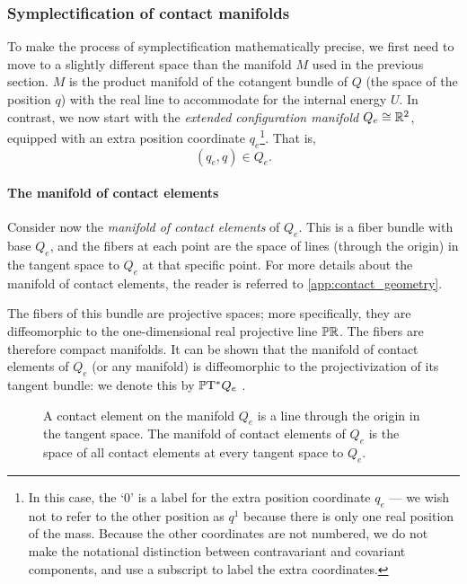 \subsubsection{Symplectification of contact manifolds}
To make the process of symplectification mathematically precise, we first need to move to a slightly different space than the manifold \(M\) used in the previous section. \(M\) is the product manifold of the cotangent bundle of \(Q\) (the space of the position \(q\)) with the real line to accommodate for the internal energy \(U\). In contrast, we now start with the \emph{extended configuration manifold} \(Q_e \cong \mathbb{R}^2\), equipped with an extra position coordinate \(q_e\)\footnote{In this case, the `0' is a label for the extra position coordinate $q_e$ --- we wish not to refer to the other position as $q^1$ because there is only one real position of the mass. Because the other coordinates are not numbered, we do not make the notational distinction between contravariant and covariant components, and use a subscript to label the extra coordinates.}. That is,
\begin{equation}
     (q_e, q) \in Q_e.
\end{equation}

\paragraph{The manifold of contact elements} Consider now the \emph{manifold of contact elements} of \(Q_e\). This is a fiber bundle with base \(Q_e\), and the fibers at each point are the space of lines (through the origin) in the tangent space to \(Q_e\) at that specific point. For more details about the manifold of contact elements, the reader is referred to \cref{app:contact_geometry}.

The fibers of this bundle are projective spaces; more specifically, they are diffeomorphic to the one-dimensional real projective line \(\mathbb{P}\mathbb{R}\). The fibers are therefore compact manifolds. It can be shown that the manifold of contact elements of \(Q_e\) (or any manifold) is diffeomorphic to the projectivization of its tangent bundle: we denote this by \(\mathbb{P}\mathrm{T}^* Q_e\) \cite{Cannas2001,Arnold1989,Libermann1987}.

\begin{figure}
    \centering
    
    \caption{A contact element on the manifold \(Q_e\) is a line through the origin in the tangent space. The manifold of contact elements of \(Q_e\) is the space of all contact elements at every tangent space to \(Q_e\).}
    \label{fig:manifold_contact_elements}
\end{figure}


